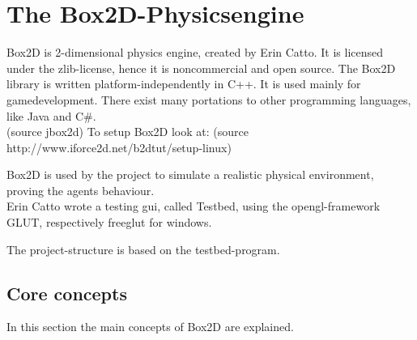 \documentclass[10pt,a4paper,DIV=11]{scrreprt}
\begin{document}










\chapter{The Box2D-Physicsengine}
Box2D is 2-dimensional physics engine, created by Erin Catto. It is licensed under the zlib-license, hence it is noncommercial and open source. The Box2D library is written platform-independently in C++. It is used mainly for gamedevelopment. There exist many portations to other programming languages, like Java and C\#. \\
(source jbox2d)
To setup Box2D look at:
(source http://www.iforce2d.net/b2dtut/setup-linux)

Box2D is used by the project to simulate a realistic physical environment, proving the agents behaviour. \\

Erin Catto wrote a testing gui, called Testbed, using the opengl-framework GLUT, respectively freeglut for windows.

The project-structure is based on the testbed-program.


\section{Core concepts}
In this section the main concepts of Box2D are explained.
\end{document}
